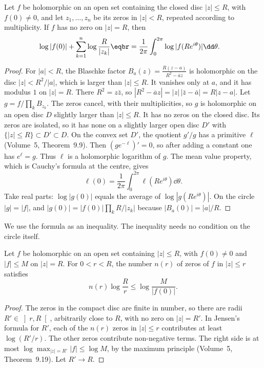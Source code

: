 \begin{theorem}\label{thm:jensen}
Let $f$ be holomorphic on an open set containing the closed disc $|z|\le R$, with $f(0)\ne0$, and let $z_1,\dots,z_n$ be its zeros in $|z|<R$, repeated according to multiplicity. If $f$ has no zero on $|z|=R$, then
\[
\begin{aligned}\log|f(0)|&+\sum_{k=1}^n\log\frac R{|z_k|}\eqbr=\frac1{2\pi}\int_0^{2\pi}\log|f(Re^{i\theta})|\dd\theta.\end{aligned}
\]
\end{theorem}
\begin{proof}
For $|a|<R$, the Blaschke factor $B_a(z)=\frac{R(z-a)}{R^2-\overline a z}$ is holomorphic on the disc $|z|<R^2/|a|$, which is larger than $|z|\le R$. It vanishes only at $a$, and it has modulus $1$ on $|z|=R$. There $R^2=z\bar z$, so $|R^2-\overline a z|=|z|\,|\bar z-\bar a|=R|z-a|$. Let $g=f/\prod_k B_{z_k}$. The zeros cancel, with their multiplicities, so $g$ is holomorphic on an open disc $D$ slightly larger than $|z|\le R$. It has no zeros on the closed disc. Its zeros are isolated, so it has none on a slightly larger open disc $D'$ with $\{|z|\le R\}\subset D'\subset D$. On the convex set $D'$, the quotient $g'/g$ has a primitive $\ell$ (Volume~5, Theorem~9.9). Then $(ge^{-\ell})'=0$, so after adding a constant one has $e^\ell=g$. Thus $\ell$ is a holomorphic logarithm of $g$. The mean value property, which is Cauchy's formula at the centre, gives
\[
\ell(0)=\frac1{2\pi}\int_0^{2\pi}\ell(Re^{i\theta})\dd\theta.
\]
Take real parts: $\log|g(0)|$ equals the average of $\log|g(Re^{i\theta})|$. On the circle $|g|=|f|$, and $|g(0)|=|f(0)|\prod_k R/|z_k|$ because $|B_a(0)|=|a|/R$.
\end{proof}

We use the formula as an inequality. The inequality needs no condition on the circle itself.

\begin{corollary}\label{cor:jensen}
Let $f$ be holomorphic on an open set containing $|z|\le R$, with $f(0)\ne0$ and $|f|\le M$ on $|z|=R$. For $0<r<R$, the number $n(r)$ of zeros of $f$ in $|z|\le r$ satisfies
\[
n(r)\log\frac Rr\le\log\frac M{|f(0)|}.
\]
\end{corollary}
\begin{proof}
The zeros in the compact disc are finite in number, so there are radii $R'\in\left]r,R\right[$, arbitrarily close to $R$, with no zero on $|z|=R'$. In Jensen's formula for $R'$, each of the $n(r)$ zeros in $|z|\le r$ contributes at least $\log(R'/r)$. The other zeros contribute non-negative terms. The right side is at most $\log\max_{|z|=R'}|f|\le\log M$, by the maximum principle (Volume~5, Theorem~9.19). Let $R'\to R$.
\end{proof}

